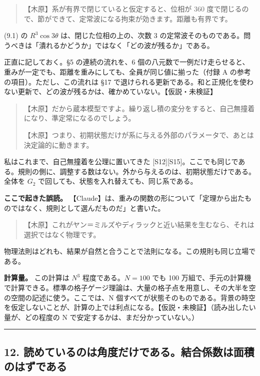 \documentclass[
  a4paper,
]{ltjsarticle}
\begin{document}
\begin{quote}
【木原】系が有界で閉じていると仮定すると、位相が 360
度で閉じるので、節ができて、定常波になる拘束が効きます。距離も有界です。
\end{quote}

(9.1) の \(R^3\cos3\theta\) は、閉じた位相の上の、次数 3
の定常波そのものである。問うべきは「潰れるかどうか」ではなく「どの波が残るか」である。

正直に記しておく。§5 の連続の流れを、6
個の八元数で一例だけ走らせると、重みが一定でも、距離を重みにしても、全員が同じ値に揃った（付録
A の参考の項目）。ただし、この流れは §17
で退けられる更新である。和と正規化を使わない更新で、どの波が残るかは、確かめていない。【仮説・未検証】

\begin{quote}
【木原】だから蔵本模型ですよ。繰り返し積の変分をすると、自己無撞着になり、準定常になるのでしょう。

【木原】つまり、初期状態だけが系に与える外部のパラメータで、あとは決定論的に動きます。
\end{quote}

私はこれまで、自己無撞着を公理に置いてきた
{[}S12{]}{[}S15{]}。ここでも同じである。規則の側に、調整する数はない。外から与えるのは、初期状態だけである。全体を
\(G_2\) で回しても、状態を入れ替えても、同じ系である。

\textbf{ここで起きた誤読。}
【Claude】は、重みの関数の形について「定理から出たものではなく、規則として選んだものだ」と書いた。

\begin{quote}
【木原】これがヤン＝ミルズやディラックと近い結果を生むなら、それは選択ではなく物理です。
\end{quote}

物理法則はどれも、結果が自然と合うことで法則になる。この規則も同じ立場である。

\textbf{計算量。} この計算は \(N^3\) 程度である。\(N = 100\) でも 100
万組で、手元の計算機で計算できる。標準の格子ゲージ理論は、大量の格子点を用意し、その大半を空の空間の記述に使う。ここでは、N
個すべてが状態そのものである。背景の時空を仮定しないことが、計算の上では利点になる。【仮説・未検証】（読み出したい量が、どの程度の
N で安定するかは、まだ分かっていない。）

\begin{center}\rule{0.5\linewidth}{0.5pt}\end{center}

\subsection{12.
読めているのは角度だけである。結合係数は面積のはずである}\label{ux8aadux3081ux3066ux3044ux308bux306eux306fux89d2ux5ea6ux3060ux3051ux3067ux3042ux308bux7d50ux5408ux4fc2ux6570ux306fux9762ux7a4dux306eux306fux305aux3067ux3042ux308b}
\end{document}
